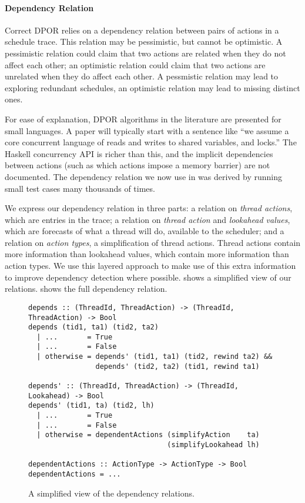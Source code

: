 \paragraph{Dependency Relation}
Correct DPOR relies on a dependency relation between pairs of actions
in a schedule trace.  This relation may be pessimistic, but cannot be
optimistic.  A pessimistic relation could claim that two actions are
related when they do not affect each other; an optimistic relation
could claim that two actions are unrelated when they do affect each
other.  A pessmistic relation may lead to exploring redundant
schedules, an optimistic relation may lead to missing distinct ones.

For ease of explanation, DPOR algorithms in the literature are
presented for small languages.  A paper will typically start with a
sentence like ``we assume a core concurrent language of reads and
writes to shared variables, and locks.''  The Haskell concurrency API
is richer than this, and the implicit dependencies between actions
(such as which actions impose a memory barrier) are not documented.
The dependency relation we now use in \dejafu{} was derived by running
small test cases many thousands of times.

We express our dependency relation in three parts: a relation on
\emph{thread actions}, which are entries in the trace; a relation on
\emph{thread action} and \emph{lookahead values}, which are forecasts
of what a thread will do, available to the scheduler; and a relation
on \emph{action types}, a simplification of thread actions.  Thread
actions contain more information than lookahead values, which contain
more information than action types.  We use this layered approach to
make use of this extra information to improve dependency detection
where possible.   shows a simplified view of our
relations.   shows the full dependency relation.

\begin{figure}[t]
  \centering
  \begin{lstlisting}
depends :: (ThreadId, ThreadAction) -> (ThreadId, ThreadAction) -> Bool
depends (tid1, ta1) (tid2, ta2)
  | ...       = True
  | ...       = False
  | otherwise = depends' (tid1, ta1) (tid2, rewind ta2) &&
                depends' (tid2, ta2) (tid1, rewind ta1)

depends' :: (ThreadId, ThreadAction) -> (ThreadId, Lookahead) -> Bool
depends' (tid1, ta) (tid2, lh)
  | ...       = True
  | ...       = False
  | otherwise = dependentActions (simplifyAction    ta)
                                 (simplifyLookahead lh)

dependentActions :: ActionType -> ActionType -> Bool
dependentActions = ...
  \end{lstlisting}
  \caption{A simplified view of the \dejafu{} dependency relations.}
  \label{fig:deprel-simp}
\end{figure}

